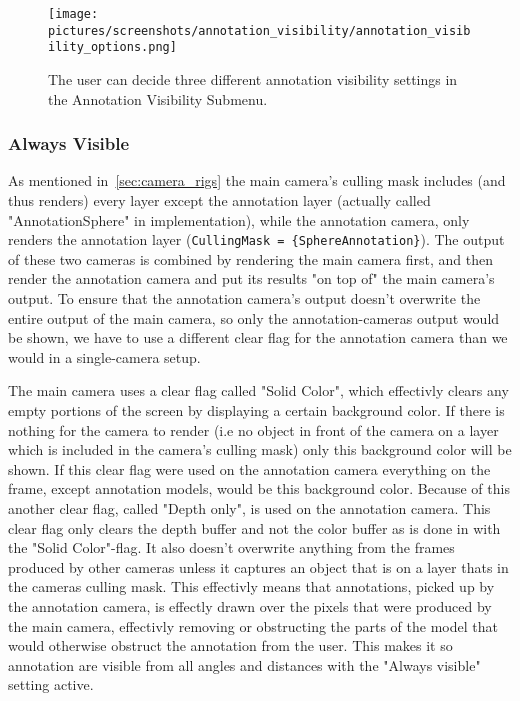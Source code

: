 \begin{figure}%
	\texttt{[image: pictures/screenshots/annotation\_visibility/annotation\_visibility\_options.png]}
	\caption[The Annotation Visibility Submenu]{The user can decide three different annotation visibility settings in the Annotation Visibility Submenu.}
	\label{fig:annotation_visibility_options}
\end{figure} 

\subsubsection{Always Visible}
As mentioned in~\vref{sec:camera_rigs} the main camera's culling mask includes (and thus renders) every layer except the 
annotation layer (actually called "AnnotationSphere" in implementation), while the annotation camera, only renders
the annotation layer (\texttt{CullingMask = \{SphereAnnotation\}}). The output of these two cameras is combined by rendering the main camera first, and
then render the annotation camera and put its results "on top of" the main camera's output.
To ensure that the annotation camera's output doesn't overwrite the entire output of the main camera,
so only the annotation-cameras output would be shown, we have to use a different clear flag for the annotation camera than we would in a single-camera setup. 

The main camera uses a clear flag called "Solid Color", which
effectivly clears any empty portions of the screen by displaying a certain background color. 
If there is nothing for the camera to render (i.e no object in front of the camera on a layer which is included in the camera's culling mask) only this background color 
will be shown. If this clear flag were used on the annotation camera everything on the frame, except annotation models, would be this background color. 
Because of this another clear flag, called "Depth only", is used on the annotation camera. This clear flag only clears the depth buffer and not the color buffer as is done 
in with the "Solid Color"-flag. It also doesn't overwrite anything from the frames produced by other cameras 
unless it captures an object that is on a layer thats in the cameras culling mask. This effectivly means that annotations, picked up by the annotation camera, is effectly drawn
over the pixels that were produced by the main camera, effectivly removing or obstructing the parts of the model that would otherwise obstruct the annotation from the user.
This makes it so annotation are visible from all angles and distances with the "Always visible" setting active. 


